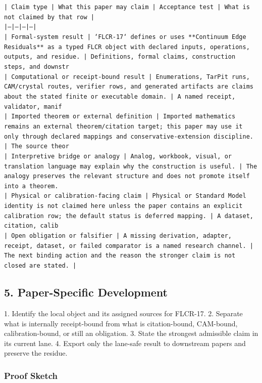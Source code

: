 \documentclass[11pt]{article}
\begin{document}
\noindent\texttt{| Claim type | What this paper may claim | Acceptance test | What is not claimed by that row |}\\
\noindent\texttt{|---|---|---|---|}\\
\noindent\texttt{| Formal-system result | `FLCR-17` defines or uses **Continuum Edge Residuals** as a typed FLCR object with declared inputs, operations, outputs, and residue. | Definitions, formal claims, construction steps, and downstr}\\
\noindent\texttt{| Computational or receipt-bound result | Enumerations, TarPit runs, CAM/crystal routes, verifier rows, and generated artifacts are claims about the stated finite or executable domain. | A named receipt, validator, manif}\\
\noindent\texttt{| Imported theorem or external definition | Imported mathematics remains an external theorem/citation target; this paper may use it only through declared mappings and conservative-extension discipline. | The source theor}\\
\noindent\texttt{| Interpretive bridge or analogy | Analog, workbook, visual, or translation language may explain why the construction is useful. | The analogy preserves the relevant structure and does not promote itself into a theorem. }\\
\noindent\texttt{| Physical or calibration-facing claim | Physical or Standard Model identity is not claimed here unless the paper contains an explicit calibration row; the default status is deferred mapping. | A dataset, citation, calib}\\
\noindent\texttt{| Open obligation or falsifier | A missing derivation, adapter, receipt, dataset, or failed comparator is a named research channel. | The next binding action and the reason the stronger claim is not closed are stated. | }\\

\subsection*{5. Paper-Specific Development}

1. Identify the local object and its assigned sources for FLCR-17.
2. Separate what is internally receipt-bound from what is citation-bound, CAM-bound, calibration-bound, or still an obligation.
3. State the strongest admissible claim in its current lane.
4. Export only the lane-safe result to downstream papers and preserve the residue.

\subsubsection*{Proof Sketch}
\end{document}
